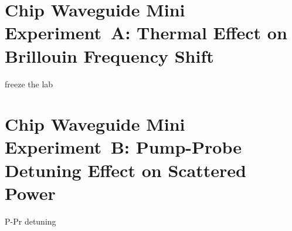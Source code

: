 \section{Chip Waveguide Mini Experiment~A: Thermal Effect on Brillouin Frequency Shift}
\label{Raman:Appendix:sec:MiniExperimentAThermal}

freeze the lab

\section{Chip Waveguide Mini Experiment~B: Pump-Probe Detuning Effect on Scattered Power}
\label{Raman:Appendix:sec:MiniExperimentBDetuning}

P-Pr detuning
